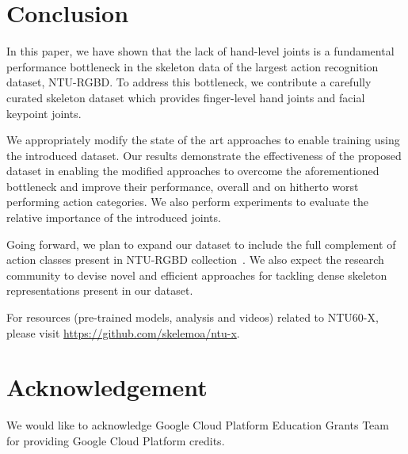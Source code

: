 \documentclass{article}
\begin{document}
\section{Conclusion}
\label{sec:conclusion}

In this paper, we have shown that the lack of hand-level joints is a fundamental performance bottleneck in the skeleton data of the largest action recognition dataset, NTU-RGBD. To address this bottleneck, we contribute a carefully curated skeleton dataset which provides finger-level hand joints and facial keypoint joints. 

We appropriately modify the state of the art approaches to enable training using the introduced dataset. Our results demonstrate the effectiveness of the proposed dataset in enabling the modified approaches to overcome the aforementioned bottleneck and improve their performance, overall and on hitherto worst performing action categories. We also perform experiments to evaluate the relative importance of the introduced joints. 

Going forward, we plan to expand our dataset to include the full complement of  action classes present in NTU-RGBD collection~\cite{Liu_2019_NTURGBD120}. We also expect the research community to devise novel and efficient approaches for tackling dense skeleton representations present in our dataset.

For resources (pre-trained models, analysis and videos) related to NTU60-X, please visit \url{https://github.com/skelemoa/ntu-x}.

\section{Acknowledgement}

We would like to acknowledge Google Cloud Platform Education Grants Team for providing Google Cloud Platform credits.



\end{document}
